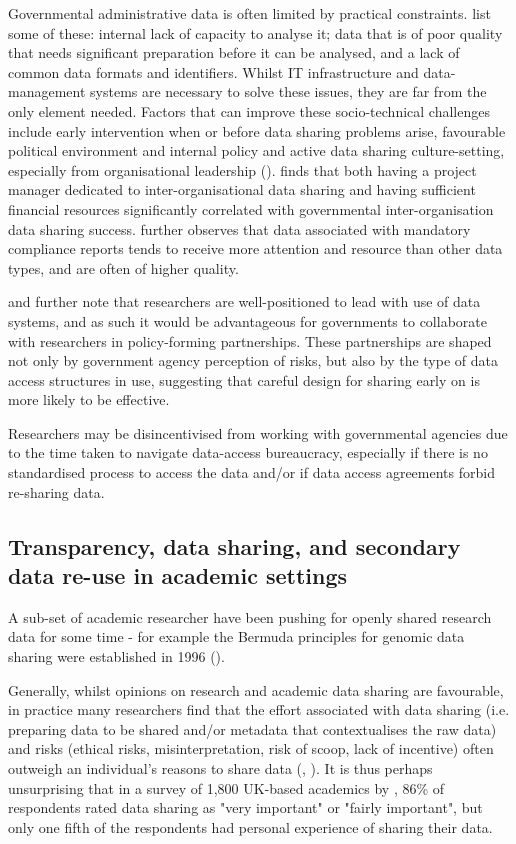 \documentclass{CUP-JNL-DAP}%
\begin{document}
Governmental administrative data is often limited by practical constraints. \cite{allard_state_2018} list some of these: internal lack of capacity to analyse it; data that is of poor quality that needs significant preparation before it can be analysed, and a lack of common data formats and identifiers. Whilst IT infrastructure and data-management systems are necessary to solve these issues, they are far from the only element needed. Factors that can improve these socio-technical challenges include early intervention when or before data sharing problems arise, favourable political environment and internal policy and active data sharing culture-setting, especially from organisational leadership (\cite{dawes_need_2009}). \cite{gil-garcia_government_2016} finds that both having a project manager dedicated to inter-organisational data sharing and having sufficient financial resources significantly correlated with governmental inter-organisation data sharing success.  \cite{allard_state_2018} further observes that data associated with mandatory compliance reports tends to receive more attention and resource than other data types, and are often of higher quality.

\cite{allard_state_2018} and \cite{graham_navigating_2016} further note that researchers are well-positioned to lead with use of data systems, and as such it would be advantageous for governments to collaborate with researchers in policy-forming partnerships. These partnerships are shaped not only by government agency perception of risks, but also by the type of data access structures in use, suggesting that careful design for sharing early on is more likely to be effective. 

Researchers may be disincentivised from working with governmental agencies due to the time taken to navigate data-access bureaucracy, especially if there is no standardised process to access the data and/or if data access agreements forbid re-sharing data.  

\subsection{Transparency, data sharing, and secondary data re-use in academic settings}
A sub-set of academic researcher have been pushing for openly shared research data for some time - for example the Bermuda principles for genomic data sharing were established in 1996 (\cite{maxson_jones_bermuda_2018}).

Generally, whilst opinions on research and academic data sharing are favourable, in practice many researchers find that the effort associated with data sharing (i.e. preparing data to be shared and/or metadata that contextualises the raw data) and risks (ethical risks, misinterpretation, risk of scoop, lack of incentive) often outweigh an individual’s reasons to share data (\cite{Yimei_Zhu_Open_access_in_uk}, \cite{datasharing_sociology}). It is thus perhaps unsurprising that in a survey of 1,800 UK-based academics by \cite{Yimei_Zhu_Open_access_in_uk}, 86\% of respondents rated data sharing as "very important" or "fairly important", but only one fifth of the respondents had personal experience of sharing their data. 
\end{document}

